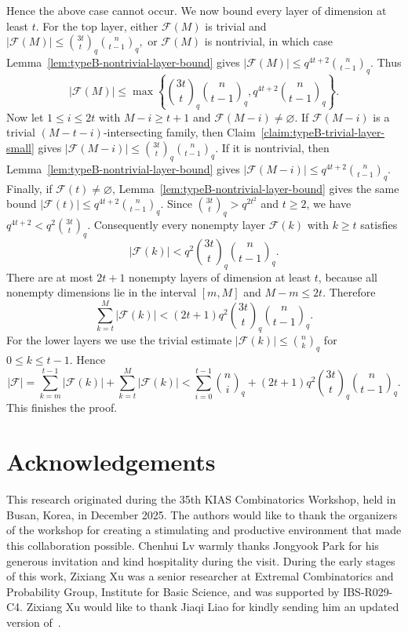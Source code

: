 \documentclass[11pt]{article}
\theoremstyle{definition}
\newcommand{\qbinom}[2]{\genfrac{(}{)}{0pt}{}{#1}{#2}_q}
\begin{document}
Hence the above case cannot occur. 
We now bound every layer of dimension at least $t$. For the top layer, either $\mathcal F(M)$ is trivial and
\(
|\mathcal F(M)|\le \qbinom{3t}{t}\qbinom{n}{t-1},
\)
or $\mathcal F(M)$ is nontrivial, in which case Lemma~\ref{lem:typeB-nontrivial-layer-bound} gives
\(
|\mathcal F(M)|\le q^{4t+2}\qbinom{n}{t-1}.
\)
Thus
\[
|\mathcal F(M)|
\le
\max\left\{
\qbinom{3t}{t}\qbinom{n}{t-1},
q^{4t+2}\qbinom{n}{t-1}
\right\}.
\]
Now let $1\le i\le 2t$ with $M-i\ge t+1$ and $\mathcal F(M-i)\neq\varnothing$. 
If $\mathcal F(M-i)$ is a trivial $(M-t-i)$-intersecting family, then Claim~\ref{claim:typeB-trivial-layer-small} gives
\(
|\mathcal F(M-i)|\le \qbinom{3t}{t}\qbinom{n}{t-1}.
\)
If it is nontrivial, then Lemma~\ref{lem:typeB-nontrivial-layer-bound} gives
\(
|\mathcal F(M-i)|\le q^{4t+2}\qbinom{n}{t-1}.
\)
Finally, if $\mathcal F(t)\neq\varnothing$, Lemma~\ref{lem:typeB-nontrivial-layer-bound} gives the same bound
\(
|\mathcal F(t)|\le q^{4t+2}\qbinom{n}{t-1}.
\)
Since $\qbinom{3t}{t}>q^{2t^2}$ and $t\ge 2$, we have
\(
q^{4t+2}<q^2\qbinom{3t}{t}.
\)
Consequently every nonempty layer $\mathcal F(k)$ with $k\ge t$ satisfies
\[
|\mathcal F(k)|<q^2\qbinom{3t}{t}\qbinom{n}{t-1}.
\]
There are at most \(2t+1\) nonempty layers of dimension at least \(t\), because all nonempty dimensions lie in the interval \([m,M]\) and \(M-m\le2t\).
Therefore
\[
\sum_{k=t}^{M}|\mathcal F(k)|
<
(2t+1)q^2\qbinom{3t}{t}\qbinom{n}{t-1}.
\]
For the lower layers we use the trivial estimate $|\mathcal F(k)|\le \qbinom{n}{k}$ for $0\le k\le t-1$. 
Hence
\[
|\mathcal F|
=
\sum_{k=m}^{t-1}|\mathcal F(k)|+\sum_{k=t}^{M}|\mathcal F(k)|
<
\sum_{i=0}^{t-1}\qbinom{n}{i}
+
(2t+1)q^2\qbinom{3t}{t}\qbinom{n}{t-1}.
\]
This finishes the proof.

\section*{Acknowledgements}

This research originated during the 35th KIAS Combinatorics Workshop, held in Busan, Korea, in December 2025. The authors would like to thank the organizers of the workshop for creating a stimulating and productive environment that made this collaboration possible. Chenhui Lv warmly thanks Jongyook Park for his generous invitation and kind hospitality during the visit. During the early stages of this work, Zixiang Xu was a senior researcher at Extremal Combinatorics and Probability Group, Institute for Basic Science, and was supported by IBS-R029-C4. Zixiang Xu would like to thank Jiaqi Liao for kindly sending him an updated version of~\cite{LLY2026}.






\end{document}

